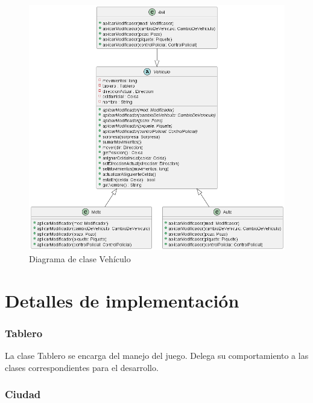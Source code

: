 \documentclass[titlepage,a4paper]{article}
\begin{document}
\begin{figure}[H]
  \centering
  \includegraphics[width=1\textwidth]{diagramas/interface-vehiculo.png}
  \caption{\label{fig:seq05} Diagrama de clase Vehículo}
\end{figure}


\section{Detalles de implementación}\label{sec:implementacion}

\subsubsection[Tablero]{Tablero}

La clase Tablero se encarga del manejo del juego. Delega su comportamiento a las clases correspondientes para el desarrollo.

\subsubsection[Ciudad]{Ciudad}
\end{document}
